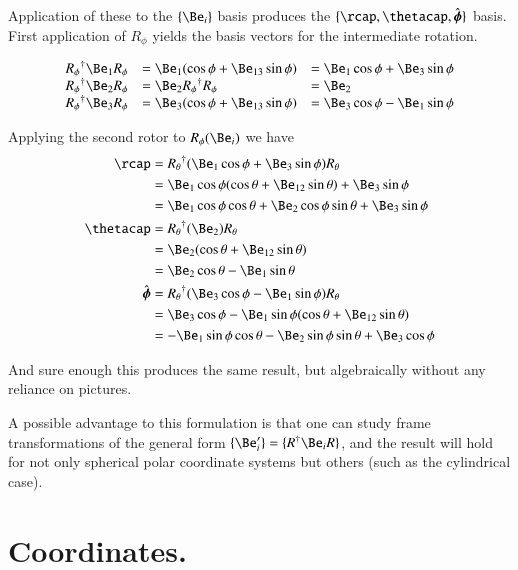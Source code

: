 \documentclass{article}
\newcommand{\phicap}[0]{\hat{\boldsymbol{\phi}}}
\begin{document}
Application of these to the $\{\Be_i\}$ basis produces the $\{\rcap, \thetacap, \phicap\}$ basis.  First application 
of $R_\phi$ yields the basis vectors for the intermediate rotation.

\begin{align*}
\begin{array}{l l l}
{R_\phi}^\dagger \Be_1 R_\phi &= \Be_1 (\cos\phi + \Be_{13} \sin\phi) &= \Be_1 \cos\phi + \Be_3 \sin\phi \\
{R_\phi}^\dagger \Be_2 R_\phi &= \Be_2 {R_\phi}^\dagger R_\phi &= \Be_2 \\
{R_\phi}^\dagger \Be_3 R_\phi &= \Be_3 (\cos\phi + \Be_{13} \sin\phi) &= \Be_3 \cos\phi - \Be_1 \sin\phi \\
\end{array}
\end{align*}

Applying the second rotor to $R_\phi(\Be_i)$ we have
\begin{align*}
\rcap 
&= {R_\theta}^\dagger ( \Be_1 \cos\phi + \Be_3 \sin\phi ) R_\theta \\
&=
\Be_1 \cos\phi (\cos\theta + \Be_{12} \sin\theta)
+ \Be_3 \sin\phi \\
&=
\Be_1 \cos\phi \cos\theta 
+ \Be_2 \cos\phi \sin\theta
+ \Be_3 \sin\phi \\
\thetacap
&= {R_\theta}^\dagger ( \Be_2 ) R_\theta \\
&= \Be_2 (\cos\theta + \Be_{12} \sin\theta) \\
&= \Be_2 \cos\theta - \Be_1 \sin\theta \\
\phicap
&= {R_\theta}^\dagger ( \Be_3 \cos\phi - \Be_1 \sin\phi ) R_\theta \\
&= \Be_3 \cos\phi - \Be_1 \sin\phi (\cos\theta + \Be_{12} \sin\theta) \\
&= 
- \Be_1 \sin\phi \cos\theta 
- \Be_2 \sin\phi \sin\theta 
+ \Be_3 \cos\phi
\\
\end{align*}

And sure enough this produces the same result, but algebraically without any reliance on pictures.

A possible
advantage to this formulation is that one can study 
frame transformations of the general form $\{\Be_i'\} = \{ R^\dagger \Be_i R \}$, and the result will hold for
not only spherical polar coordinate systems but others (such as the cylindrical case).

\section{ Coordinates. } 
\end{document}
